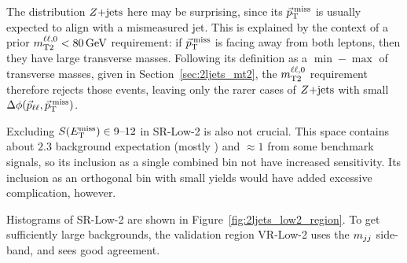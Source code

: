 The distribution $\zjets$ here may be surprising, since its $\ptmiss$ is
usually expected to align with a mismeasured jet.
This is explained by the context of a prior $\mttwoll < 80\,\eV[G]$
requirement:
if $\ptmiss$ is facing away from both leptons, then they have large transverse
masses.
Following its definition as a $\min-\max$ of transverse masses,
given in Section~\ref{sec:2ljets_mt2},
the $\mttwoll$ requirement therefore rejects those events, leaving only the
rarer cases of $\zjets$ with small $\dphillmet$.

Excluding $\metsig \in 9\textrm{--}12$ in SR-Low-2 is also not crucial.
This space contains about $2.3$ background expectation (mostly \diboson) and
$\approx 1$ from some benchmark signals, so its inclusion as a single combined
bin not have increased sensitivity.
Its inclusion as an orthogonal bin with small yields would have added excessive
complication, however.

Histograms of SR-Low-2 are shown in Figure~\ref{fig:2ljets_low2_region}.
To get sufficiently large backgrounds, the validation region VR-Low-2 uses
the $\mjj$ side-band, and sees good agreement.

